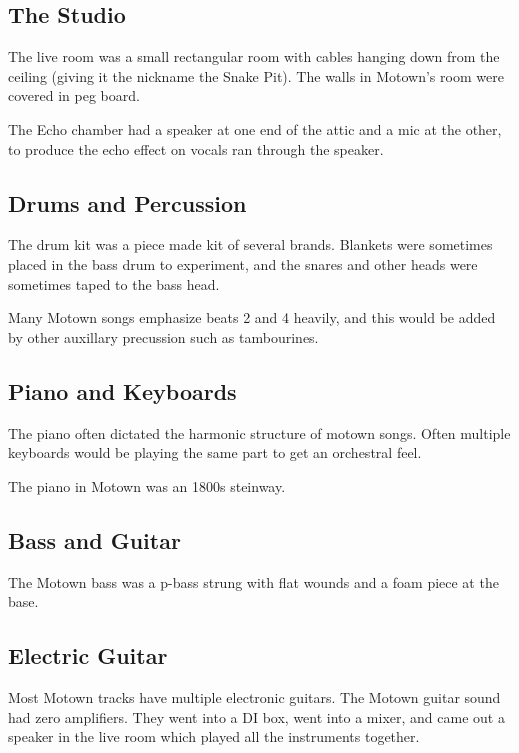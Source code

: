 \documentclass[12pt, a4paper, twoside, openright, titlepage]{book}
\begin{document}
\subsection{The Studio}

The live room was a small rectangular room with cables hanging down from the ceiling (giving it the nickname the Snake Pit). The walls in Motown's room were covered in peg board. 


The Echo chamber had a speaker at one end of the attic and a mic at the other, to produce the echo effect on vocals ran through the speaker.


\subsection{Drums and Percussion}

The drum kit was a piece made kit of several brands. Blankets were sometimes placed in the bass drum to experiment, and the snares and other heads were sometimes taped to the bass head. 

Many Motown songs emphasize beats 2 and 4 heavily, and this would be added by other auxillary precussion such as tambourines.


\subsection{Piano and Keyboards}

The piano often dictated the harmonic structure of motown songs. Often multiple keyboards would be playing the same part to get an orchestral feel. 

The piano in Motown was an 1800s steinway. 

\subsection{Bass and Guitar}

The Motown bass was a p-bass strung with flat wounds and a foam piece at the base. 


\subsection{Electric Guitar}

Most Motown tracks have multiple electronic guitars. The Motown guitar sound had zero amplifiers. They went into a DI box, went into a mixer, and came out a speaker in the live room which played all the instruments together.
\end{document}
